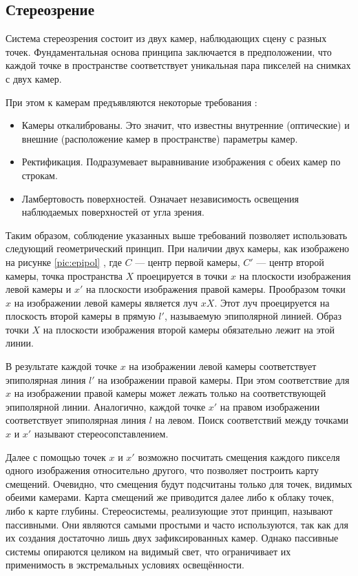 
\subsection{Стереозрение}
\label{stereovision}
Система стереозрения состоит из двух камер, наблюдающих сцену с разных точек. 
Фундаментальная основа принципа заключается в предположении, что каждой точке в пространстве соответствует уникальная пара пикселей на снимках с двух камер.  

При этом к камерам предъявляются некоторые требования \cite{rusoverview}:   %
\begin{itemize}
	\item Камеры откалиброваны. Это значит, что известны внутренние (оптические) и внешние (расположение камер в пространстве) параметры камер. 
	\item Ректификация. Подразумевает выравнивание изображения с обеих камер по строкам.  %
	\item Ламбертовость поверхностей. Означает независимость освещения наблюдаемых поверхностей от угла зрения. 
\end{itemize}

Таким образом, соблюдение указанных выше требований позволяет использовать следующий геометрический принцип. При наличии двух камеры, как изображено 
на рисунке \ref{pic:epipol} \cite{Hartley2004}, где $C$ — центр первой камеры, $C'$ — центр второй камеры, точка пространства $X$  
проецируется в точки $x$ на плоскости изображения левой камеры и $x'$ на плоскости изображения правой камеры. Прообразом точки $x$ на изображении левой 
камеры является луч $xX$. Этот луч проецируется на плоскость второй камеры в прямую $l'$, называемую эпиполярной линией. Образ точки $X$ на плоскости 
изображения второй камеры обязательно лежит на этой линии.


В результате каждой точке $x$ на изображении левой камеры соответствует эпиполярная линия $l'$ на изображении правой камеры. При этом соответствие для $x$ на 
изображении правой камеры может лежать только на соответствующей эпиполярной линии. Аналогично, каждой точке $x'$ на правом изображении соответствует 
эпиполярная линия $l$ на левом. Поиск соответствий между точками $x$ и $x'$ называют стереосопставлением.

Далее с помощью точек $x$ и $x'$ возможно посчитать смещения каждого пикселя одного изображения относительно другого, что позволяет построить карту смещений. 
Очевидно, что смещения будут подсчитаны только для точек, видимых обеими камерами. Карта смещений же приводится далее либо к облаку точек, либо к карте глубины. 
Стереосистемы, реализующие этот принцип, называют пассивными. Они являются самыми простыми и часто используются, так как для их создания достаточно лишь
двух зафиксированных камер. Однако пассивные системы опираются целиком на видимый свет, что ограничивает их применимость в экстремальных условиях освещённости. %

